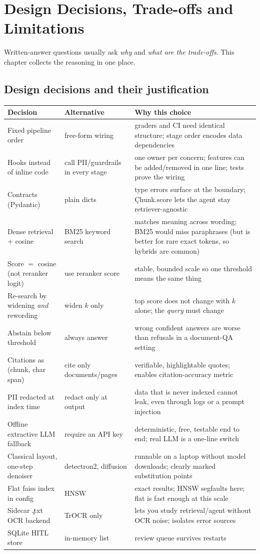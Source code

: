 \chapter{Design Decisions, Trade-offs and Limitations}
Written-answer questions usually ask \emph{why} and \emph{what are the trade-offs}. This chapter collects the reasoning in one place.

\section{Design decisions and their justification}
\begin{longtable}{@{}p{3.4cm}p{4.9cm}p{6.2cm}@{}}\toprule Decision & Alternative & Why this choice \\ \midrule \endhead
Fixed pipeline order & free-form wiring & graders and CI need identical structure; stage order encodes data dependencies \\
Hooks instead of inline code & call PII/guardrails in every stage & one owner per concern; features can be added/removed in one line; tests prove the wiring \\
Contracts (Pydantic) & plain dicts & type errors surface at the boundary; \c{Chunk.score} lets the agent stay retriever-agnostic \\
Dense retrieval + cosine & BM25 keyword search & matches meaning across wording; BM25 would miss paraphrases (but is better for rare exact tokens, so hybrids are common) \\
Score $=$ cosine (not reranker logit) & use reranker score & stable, bounded scale so one threshold means the same thing \\
Re-search by widening \emph{and} rewording & widen $k$ only & top score does not change with $k$ alone; the \emph{query} must change \\
Abstain below threshold & always answer & wrong confident answers are worse than refusals in a document-QA setting \\
Citations as (chunk, char span) & cite only documents/pages & verifiable, highlightable quotes; enables citation-accuracy metric \\
PII redacted at index time & redact only at output & data that is never indexed cannot leak, even through logs or a prompt injection \\
Offline extractive LLM fallback & require an API key & deterministic, free, testable end to end; real LLM is a one-line switch \\
Classical layout, one-step denoiser & detectron2, diffusion & runnable on a laptop without model downloads; clearly marked substitution points \\
Flat faiss index in config & HNSW & exact results; HNSW segfaults here; flat is fast enough at this scale \\
Sidecar \c{.txt} OCR backend & TrOCR only & lets you study retrieval/agent without OCR noise; isolates error sources \\
SQLite HITL store & in-memory list & review queue survives restarts \\
\bottomrule\end{longtable}

